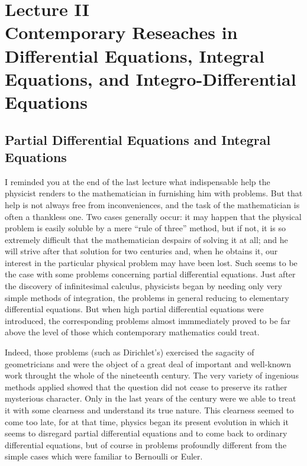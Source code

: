 \documentclass[12pt,oneside]{book}
\begin{document}
\chapter[Lecture II]{Lecture II\\Contemporary Reseaches in Differential Equations, Integral Equations, and Integro-Differential Equations}
\section{Partial Differential Equations and Integral Equations}
I reminded you at the end of the last lecture what indispensable help the physicist renders to the mathematician in furnishing him with problems. But that help is not always free from inconveniences, and the task of the mathematician is often a thankless one. Two cases generally occur: it may happen that the physical problem is easily soluble by a mere ``rule of three'' method, but if not, it is so extremely difficult that the mathematician despairs of solving it at all; and he will strive after that solution for two centuries and, when he obtains it, our interest in the particular physical problem may have been lost. Such seems to be the case with some problems concerning partial differential equations. Just after the discovery of infinitesimal calculus, physicists began by needing only very simple methods of integration, the problems in general reducing to elementary differential equations. But when high partial differential equations were introduced, the corresponding problems almost immmediately proved to be far above the level of those which contemporary mathematics could treat. \par

Indeed, those problems (such as Dirichlet's) exercised the sagacity of geometricians and were the object of a great deal of important and well-known work throught the whole of the nineteenth century. The very variety of ingenious methods applied showed that the question did not cease to preserve its rather mysterious character. Only in the last years of the century were we able to treat it with some clearness and understand its true nature. This clearness seemed to come too late, for at that time, physics began its present evolution in which it seems to disregard partial differential equations and to come back to ordinary differential equations, but of course in problems profoundly different from the simple cases which were familiar to Bernoulli or Euler. \par
\end{document}

